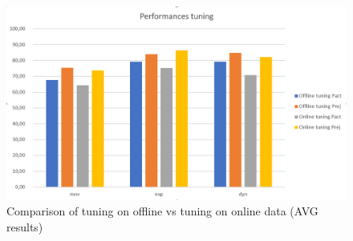 \begin{figure}
    \begin{center}
        \includegraphics[width=0.8\linewidth]{img/tunings_performances.png}
    \end{center}

    \caption{Comparison of tuning on offline vs tuning on online data (AVG results)}
    \label{fig:/comparison_tunings}
\end{figure}
